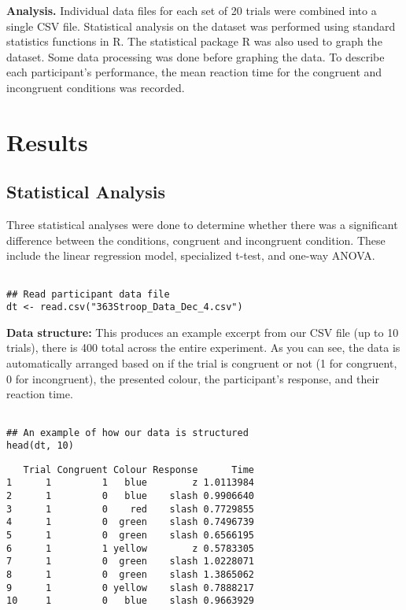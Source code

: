 \documentclass{article}
\begin{document}
\textbf{Analysis.}  Individual data files for each set of 20 trials were combined into a single CSV file. Statistical analysis on the dataset was performed using standard statistics functions in R. The statistical package R was also used to graph the dataset. Some data processing was done before graphing the data. To describe each participant's performance, the mean reaction time for the congruent and incongruent conditions was recorded. \\
\section{Results}
\label{sec:orgc58774f}
\subsection{Statistical Analysis}
\label{sec:orgc54f318}
\vspace{1em} Three statistical analyses were done to determine whether there was a significant difference between the conditions, congruent and incongruent condition. These include the linear regression model, specialized t-test, and one-way ANOVA.

\begin{verbatim}

## Read participant data file
dt <- read.csv("363Stroop_Data_Dec_4.csv")

\end{verbatim}

\textbf{Data structure:} This produces an example excerpt from our CSV file (up to 10 trials), there is 400 total across the entire experiment. As you can see, the data is automatically arranged based on if the trial is congruent or not (1 for congruent, 0 for incongruent), the presented colour, the participant's response, and their reaction time.
\begin{verbatim}

## An example of how our data is structured
head(dt, 10)
\end{verbatim}

\begin{verbatim}
   Trial Congruent Colour Response      Time
1      1         1   blue        z 1.0113984
2      1         0   blue    slash 0.9906640
3      1         0    red    slash 0.7729855
4      1         0  green    slash 0.7496739
5      1         0  green    slash 0.6566195
6      1         1 yellow        z 0.5783305
7      1         0  green    slash 1.0228071
8      1         0  green    slash 1.3865062
9      1         0 yellow    slash 0.7888217
10     1         0   blue    slash 0.9663929
\end{verbatim}
\end{document}
